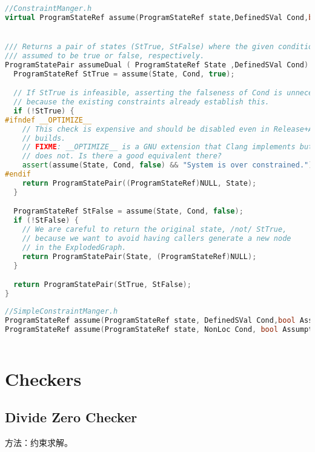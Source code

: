 \documentclass[a4paper]{article}
\begin{document}
  \begin{lstlisting}[language=C++]
//ConstraintManger.h
virtual ProgramStateRef assume(ProgramStateRef state,DefinedSVal Cond,bool Assumption) = 0; 


/// Returns a pair of states (StTrue, StFalse) where the given condition is
/// assumed to be true or false, respectively.
ProgramStatePair assumeDual ( ProgramStateRef State ,DefinedSVal Cond) {
  ProgramStateRef StTrue = assume(State, Cond, true);

  // If StTrue is infeasible, asserting the falseness of Cond is unnecessary
  // because the existing constraints already establish this.
  if (!StTrue) {
#ifndef __OPTIMIZE__
    // This check is expensive and should be disabled even in Release+Asserts
    // builds.
    // FIXME: __OPTIMIZE__ is a GNU extension that Clang implements but MSVC
    // does not. Is there a good equivalent there?
    assert(assume(State, Cond, false) && "System is over constrained.");
#endif
    return ProgramStatePair((ProgramStateRef)NULL, State);
  }

  ProgramStateRef StFalse = assume(State, Cond, false);
  if (!StFalse) {
    // We are careful to return the original state, /not/ StTrue,
    // because we want to avoid having callers generate a new node
    // in the ExplodedGraph.
    return ProgramStatePair(State, (ProgramStateRef)NULL);
  }

  return ProgramStatePair(StTrue, StFalse);
}

  \end{lstlisting}
  
  \begin{lstlisting}[language=C++]
//SimpleConstraintManger.h
ProgramStateRef assume(ProgramStateRef state, DefinedSVal Cond,bool Assumption);
ProgramStateRef assume(ProgramStateRef state, NonLoc Cond, bool Assumption);
   
  \end{lstlisting}
  
  
  
  
  \section{Checkers}
  \subsection{Divide Zero Checker}
方法：约束求解。
\end{document}
